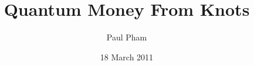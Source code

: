 \documentclass[twocolumn,10pt]{article}
\title{Quantum Money From Knots}
\date{18 March 2011}
\author{Paul Pham}
\theoremstyle{plain}
\begin{document}
\newcommand{\ket}[1]{|#1 \rangle}
\newcommand{\bra}[1]{\langle #1 |}
\newcommand{\braket}[2]{\langle #1|#2 \rangle}
\newcommand{\normtwo}{\frac{1}{\sqrt{2}}}
\newcommand{\norm}[1]{\parallel #1 \parallel}

\maketitle

















\end{document}
